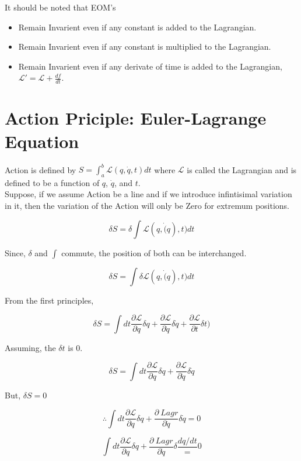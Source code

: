 \documentclass[a4paper]{article}
\newcommand{\Lagr}{\mathcal{L}}
\newcommand{\ddtf}[1]{\frac{d #1}{dt}}
\begin{document}
		It should be noted that EOM's
		\begin{itemize}
			\item Remain Invarient even if any constant is added to the Lagrangian.
			\item Remain Invarient even if any constant is multiplied to the Lagrangian.
			\item Remain Invarient even if any derivate of time is added to the Lagrangian, $\Lagr' = \Lagr + \ddtf{f}$. 
	
		\end{itemize}

	\section*{Action Priciple: Euler-Lagrange Equation }
		
		\noindent
		
		Action is defined by $S = \int_a^b \Lagr(q, \dot{q}, t) dt$ where $\Lagr$ is called the Lagrangian and is defined to be a function of $q$, $\dot{q}$, and $t$. \hfill \\

		Suppose, if we assume Action be a line and if we introduce infintisimal variation in it, then the variation of the Action will only be Zero for extremum positions.

		$$ \delta S = \delta \int \Lagr(q, \dot(q), t) dt $$

		Since, $\delta$ and $\int$ commute, the position of both can be interchanged.

		$$ \delta S = \int \delta \Lagr(q, \dot(q), t) dt $$

		From the first principles,

		$$ \delta S = \int dt \frac{\partial\Lagr}{\partial q}\delta q + \frac{\partial\Lagr}{\partial\dot{q}}\delta \dot{q} + \frac{\partial\Lagr}{\partial t}\delta t) $$

		Assuming, the $\delta t$ is $0$.

		$$ \delta S = \int dt \frac{\partial\Lagr}{\partial q}\delta q + \frac{\partial\Lagr}{\partial\dot{q}}\delta \dot{q} $$

		But, $\delta S = 0$

		$$ \therefore \int dt \frac{\partial\Lagr}{\partial q}\delta q + \frac{\partial\ Lagr}{\partial\dot{q}}\delta \dot{q} = 0 $$

		$$ \int dt \frac{\partial\Lagr}{\partial q}\delta q + \frac{\partial\ Lagr}{\partial\dot{q}}\delta \frac{dq/dt} = 0 $$
		
\end{document}
